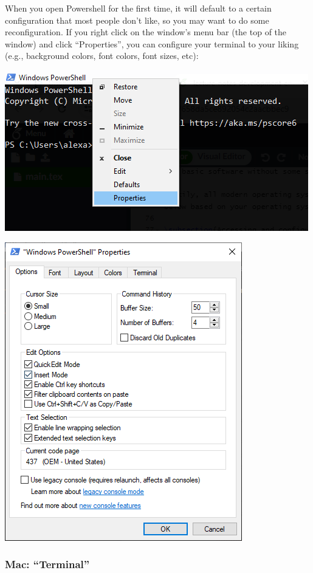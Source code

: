 \documentclass{article}
\makeatletter
\def\maxwidth#1{\ifdim\Gin@nat@width>#1 #1\else\Gin@nat@width\fi}
\makeatother
\begin{document}
When you open Powershell for the first time, it will default to a certain configuration that most people don't like, so you may want to do some reconfiguration. If you right click on the window's menu bar (the top of the window) and click ``Properties'', you can configure your terminal to your liking (e.g., background colors, font colors, font sizes, etc):

\includegraphics[width=\maxwidth{0.95\columnwidth}]{res/properties.PNG}

\includegraphics[width=\maxwidth{0.95\columnwidth}]{res/properties-window.PNG}

\subsubsection{Mac: ``Terminal''}
\end{document}
